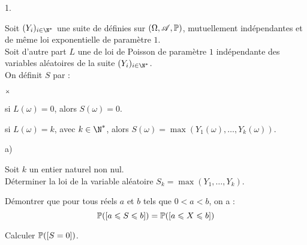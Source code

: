 \documentclass[11pt]{article}%
\begin{document}
\begin{noliste}{1.}
 \item Soit $(Y_i)_{i\in\N^*}$ une suite de \var définies sur $(\Omega, 
 \mathscr{A}, \mathbb{P})$, mutuellement indépendantes et de même loi exponentielle 
 de paramètre $1$.\\
 Soit d'autre part $L$ une \var de loi de Poisson de paramètre $1$ 
 indépendante des variables aléatoires de la suite $(Y_i)_{i\in\N^*}$.\\
 On définit $S$ par :
 \begin{noliste}{$\scriptstyle \times$}
  \item si $L(\omega)=0$, alors $S(\omega)=0$.
  \item si $L(\omega)=k$, avec $k\in\N^*$, alors $S(\omega) = 
  \max(Y_1(\omega), \hdots, Y_k(\omega))$.
 \end{noliste}
 \begin{noliste}{a)}
  \item Soit $k$ un entier naturel non nul.\\
  Déterminer la loi de la variable aléatoire $S_k=\max(Y_1,\hdots, 
  Y_k)$.
  \item Démontrer que pour tous réels $a$ et $b$ tels que $0<a<b$, 
  on a :
  \[
   \mathbb{P}(\left[ {a\leqslant S \leqslant b} \right]) = \mathbb{P}(\left[ {a\leqslant X \leqslant b} \right])
  \]
  \item Calculer $\mathbb{P}(\left[ {S=0} \right])$.
 \end{noliste}
\end{noliste}
\end{document}
